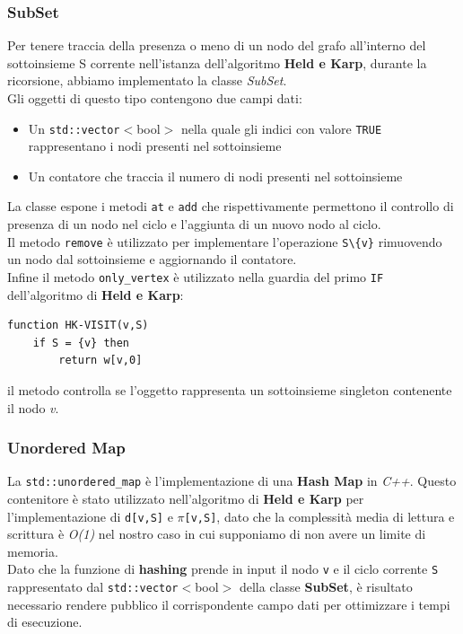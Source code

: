 \documentclass[]{article}
\begin{document}
\subsubsection{SubSet}
\begin{flushleft}
Per tenere traccia della presenza o meno di un nodo del grafo all'interno del sottoinsieme S corrente nell'istanza dell'algoritmo \textbf{Held e Karp}, durante la ricorsione, abbiamo implementato la classe \textit{SubSet}.\\
Gli oggetti di questo tipo contengono due campi dati:
\begin{itemize}
	\item Un \verb|std::vector|$<$bool$>$ nella quale gli indici con valore \verb|TRUE| rappresentano i nodi presenti nel sottoinsieme
	\item Un contatore che traccia il numero di nodi presenti nel sottoinsieme
\end{itemize}

La classe espone i metodi \verb|at| e \verb|add| che rispettivamente permettono il controllo di presenza di un nodo nel ciclo e l'aggiunta di un nuovo nodo al ciclo.\\
Il metodo \verb|remove| è utilizzato per implementare l'operazione \verb|S\{v}| rimuovendo un nodo dal sottoinsieme e aggiornando il contatore.\\
Infine il metodo \verb|only_vertex| è utilizzato nella guardia del primo \verb|IF| dell'algoritmo di \textbf{Held e Karp}:
\begin{lstlisting}[mathescape=true]
function HK-VISIT(v,S)
	if S = {v} then
		return w[v,0]
\end{lstlisting}
il metodo controlla se l'oggetto rappresenta un sottoinsieme singleton contenente il nodo \textit{v}.
\end{flushleft}
\subsubsection{Unordered Map}
La \verb|std::unordered_map| è l'implementazione di una \textbf{Hash Map} in \textit{C++}. Questo contenitore è stato utilizzato nell'algoritmo di \textbf{Held e Karp} per l'implementazione di \verb|d[v,S]| e $\pi$\verb|[v,S]|, dato che la complessità media di lettura e scrittura è \textit{O(1)} nel nostro caso in cui supponiamo di non avere un limite di memoria.\\
Dato che la funzione di \textbf{hashing} prende in input il nodo \verb|v| e il ciclo corrente \verb|S| rappresentato dal \verb|std::vector|$<$bool$>$ della classe \textbf{SubSet}, è risultato necessario rendere pubblico il corrispondente campo dati per ottimizzare i tempi di esecuzione.
\end{document}

